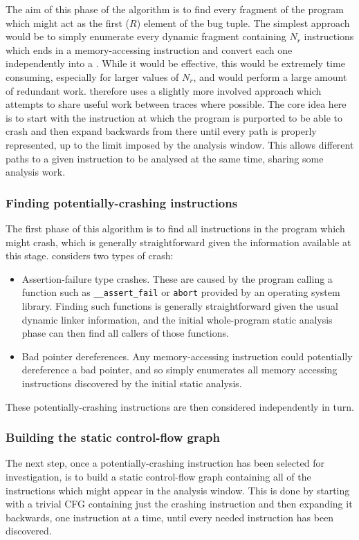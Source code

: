 The aim of this phase of the algorithm is to find every fragment of
the program which might act as the first ($R$) element of the bug
tuple.  The simplest approach would be to simply enumerate every
dynamic fragment containing $N_r$ instructions which ends in a
memory-accessing instruction and convert each one independently into a
\StateMachine.  While it would be effective, this would be extremely
time consuming, especially for larger values of $N_r$, and would
perform a large amount of redundant work.  \Technique{} therefore uses
a slightly more involved approach which attempts to share useful work
between traces where possible.  The core idea here is to start with
the instruction at which the program is purported to be able to crash
and then expand backwards from there until every path is properly
represented, up to the limit imposed by the analysis window.  This
allows different paths to a given instruction to be analysed at the
same time, sharing some analysis work.

\subsubsection{Finding potentially-crashing instructions}

The first phase of this algorithm is to find all instructions in the
program which might crash, which is generally straightforward given
the information available at this stage.  {\Implementation} considers
two types of crash:

\begin{itemize}
\item Assertion-failure type crashes.  These are caused by the program
  calling a function such as \verb|__assert_fail| or \verb|abort|
  provided by an operating system library.  Finding such functions is
  generally straightforward given the usual dynamic linker
  information, and the initial whole-program static analysis phase can
  then find all callers of those functions.
\item Bad pointer dereferences.  Any memory-accessing instruction
  could potentially dereference a bad pointer, and so
  {\implementation} simply enumerates all memory accessing
  instructions discovered by the initial static analysis.
\end{itemize}

These potentially-crashing instructions are then considered
independently in turn.

\subsubsection{Building the static control-flow graph}
The next step, once a potentially-crashing instruction has been
selected for investigation, is to build a static control-flow graph
containing all of the instructions which might appear in the analysis
window.  This is done by starting with a trivial CFG containing just
the crashing instruction and then expanding it backwards, one
instruction at a time, until every needed instruction has been
discovered.

